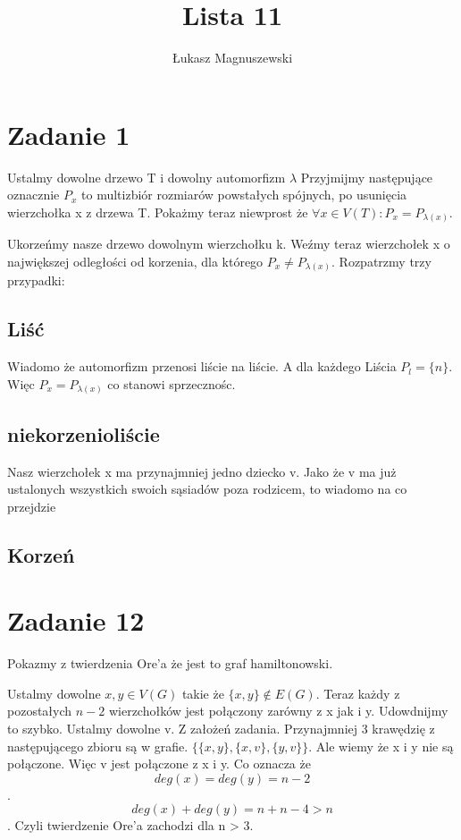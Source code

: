\documentclass{article}
\title{Lista 11}
\author{Łukasz Magnuszewski}
\date{\vspace{-5ex}}
\begin{document}
\maketitle

\section{Zadanie 1}

Ustalmy dowolne drzewo T i dowolny automorfizm $\lambda$
Przyjmijmy następujące oznacznie $P_x$ to multizbiór rozmiarów powstałych spójnych, po usunięcia wierzchołka x z drzewa T. Pokażmy teraz niewprost że $\forall x \in V(T): P_x = P_{\lambda(x)}$.

Ukorzeńmy nasze drzewo dowolnym wierzchołku k. Weźmy teraz wierzchołek x o największej odległości od korzenia, dla którego $P_x \neq P_{\lambda(x)}$. Rozpatrzmy trzy przypadki:

\subsection*{Liść}
Wiadomo że automorfizm przenosi liście na liście. A dla każdego Liścia $P_l = \{n \}$. Więc $P_x = P_{\lambda(x)}$ co stanowi sprzecznośc.

\subsection*{niekorzenioliście}
Nasz wierzchołek x ma przynajmniej jedno dziecko v. Jako że v ma już ustalonych wszystkich swoich sąsiadów poza rodzicem, to wiadomo na co przejdzie

\subsection*{Korzeń}


\section*{Zadanie 12}
Pokazmy z twierdzenia Ore'a że jest to graf hamiltonowski.

Ustalmy dowolne $x, y \in V(G)$ takie że $\{x, y\} \not\in E(G)$. Teraz każdy z pozostałych $n-2$ wierzchołków jest połączony zarówny z x jak i y. Udowdnijmy to szybko. Ustalmy dowolne v. Z założeń zadania. Przynajmniej 3 krawędzię z następującego zbioru są w grafie. $\{ \{x,y\}, \{x,v\}, \{y,v\} \}$. Ale wiemy że x i y nie są połączone. Więc v jest połączone z x i y. Co oznacza że \[deg(x) = deg(y) = n - 2 \]. 
\[deg(x) + deg(y) = n + n - 4 > n\]. Czyli twierdzenie Ore'a zachodzi dla n > 3.
\end{document}
